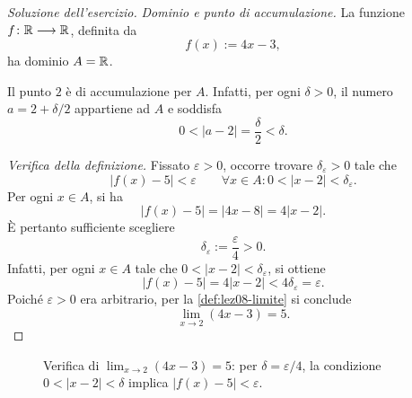 \begin{proof}[Soluzione dell'esercizio]
\emph{Dominio e punto di accumulazione.}
La funzione \(f\colon\mathbb{R}\longrightarrow\mathbb{R}\), definita da
\[
  f(x):=4x-3,
\]
ha dominio \(A=\mathbb{R}\).

Il punto \(2\) è di accumulazione per \(A\). Infatti, per ogni
\(\delta>0\), il numero \(a=2+\delta/2\) appartiene ad \(A\)
e soddisfa
\[
  0<|a-2|=\frac{\delta}{2}<\delta.
\]

\emph{Verifica della definizione.}
Fissato \(\varepsilon>0\), occorre trovare \(\delta_\varepsilon>0\)
tale che
\[
  |f(x)-5|<\varepsilon
  \qquad\forall x\in A:
  0<|x-2|<\delta_\varepsilon.
\]
Per ogni \(x\in A\), si ha
\[
  |f(x)-5|=|4x-8|=4|x-2|.
\]
È pertanto sufficiente scegliere
\[
  \delta_\varepsilon:=\frac{\varepsilon}{4}>0.
\]
Infatti, per ogni \(x\in A\) tale che
\(0<|x-2|<\delta_\varepsilon\), si ottiene
\[
  |f(x)-5|=4|x-2|
  <4\delta_\varepsilon=\varepsilon.
\]
Poiché \(\varepsilon>0\) era arbitrario, per la
\cref{def:lez08-limite} si conclude
\[
  \lim_{x\to2}(4x-3)=5.
\]
\end{proof}
\begin{figure}[htbp]
  \centering
  
  \caption{Verifica di \(\lim_{x\to2}(4x-3)=5\):
  per \(\delta=\varepsilon/4\), la condizione
  \(0<|x-2|<\delta\) implica \(|f(x)-5|<\varepsilon\).}
  \label{fig:limite-lineare}
\end{figure}
